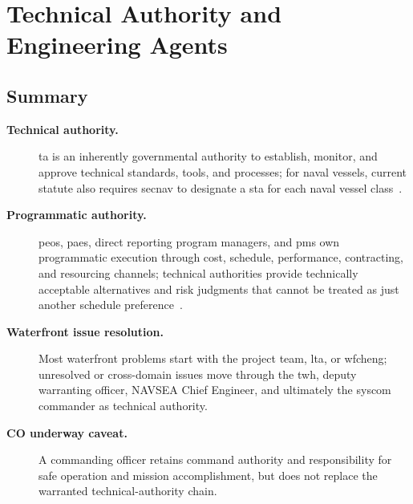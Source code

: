 \documentclass[../main.tex]{subfiles}
\begin{document}

\section{Technical Authority and Engineering Agents}

\subsection{Summary}
\begin{description}
  \item[\textbf{Technical authority.}] \ac{ta} is an inherently governmental authority to establish,
  monitor, and approve technical standards, tools, and processes; for naval vessels, current statute also
  requires \ac{secnav} to designate a \ac{sta} for each naval vessel class~\autocite{SECNAV5400-15D,USC-10-8669b}.
  \item[\textbf{Programmatic authority.}] \acp{peo}, \acp{pae}, direct reporting program managers, and
  \acp{pm} own programmatic execution through cost, schedule, performance, contracting, and resourcing
  channels; technical authorities provide technically acceptable alternatives and risk judgments that
  cannot be treated as just another schedule preference~\autocite{SECNAV5400-15D,SECNAV5000-2G}.
  \item[\textbf{Waterfront issue resolution.}] Most waterfront problems start with the project team,
  \ac{lta}, or \ac{wfcheng}; unresolved or cross-domain issues move through the \ac{twh}, deputy warranting
  officer, NAVSEA Chief Engineer, and ultimately the \ac{syscom} commander as technical authority.
  \item[\textbf{CO underway caveat.}] A commanding officer retains command authority and responsibility for
  safe operation and mission accomplishment, but does not replace the warranted technical-authority chain.
\end{description}
\end{document}

